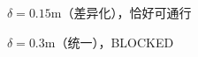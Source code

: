 \begin{subfigure}[b]{0.48\textwidth}
  \centering
  \caption{$\delta{=}0.15$m（差异化），恰好可通行}
\end{subfigure}\hfill
\begin{subfigure}[b]{0.48\textwidth}
  \centering
  \caption{$\delta{=}0.3$m（统一），BLOCKED}
\end{subfigure}
